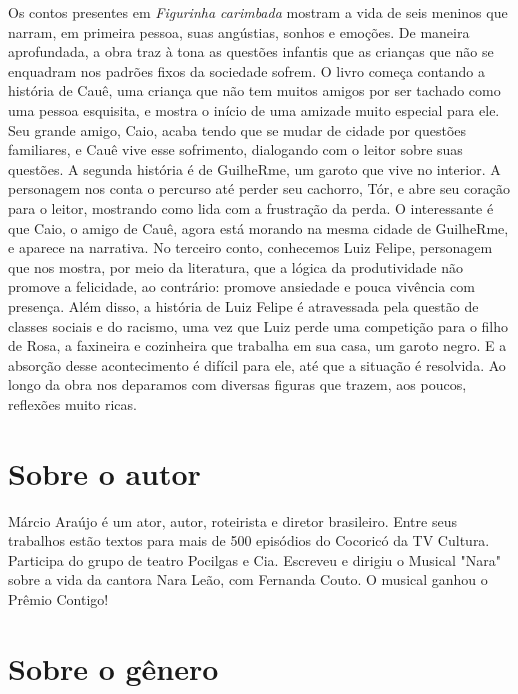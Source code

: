 \documentclass[11pt]{extarticle}
\begin{document}
Os contos presentes em \textit{Figurinha carimbada} mostram a vida de seis meninos que narram, em primeira pessoa, suas angústias, sonhos e emoções. De maneira aprofundada, a obra traz à tona as questões infantis que as crianças que não se enquadram nos padrões fixos da sociedade sofrem. O livro começa contando a história de Cauê, uma criança que não tem muitos amigos por ser tachado como uma pessoa esquisita, e mostra o início de uma amizade muito especial para ele. Seu grande amigo, Caio, acaba tendo que se mudar de cidade por questões familiares, e Cauê vive esse sofrimento, dialogando com o leitor sobre suas questões. A segunda história é de GuilheRme, um garoto que vive no interior. A personagem nos conta o percurso até perder seu cachorro, Tór, e abre seu coração para o leitor, mostrando como lida com a frustração da perda. O interessante é que Caio, o amigo de Cauê, agora está morando na mesma cidade de GuilheRme, e aparece na narrativa. No terceiro conto, conhecemos Luiz Felipe, personagem que nos mostra, por meio da literatura, que a lógica da produtividade não promove a felicidade, ao contrário: promove ansiedade e pouca vivência com presença. Além disso, a história de Luiz Felipe é atravessada pela questão de classes sociais e do racismo, uma vez que Luiz perde uma competição para o filho de Rosa, a faxineira e cozinheira que trabalha em sua casa, um garoto negro. E a absorção desse acontecimento é difícil para ele, até que a situação é resolvida. Ao longo da obra nos deparamos com diversas figuras que trazem, aos poucos, reflexões muito ricas.


\section{Sobre o autor}

Márcio Araújo é um ator, autor, roteirista e diretor brasileiro. Entre seus trabalhos estão textos para mais de 500 episódios do Cocoricó da TV Cultura. Participa do grupo de teatro Pocilgas e Cia. Escreveu e dirigiu o Musical "Nara" sobre a vida da cantora Nara Leão, com Fernanda Couto. O musical ganhou o Prêmio Contigo!


\section{Sobre o gênero}
\end{document}
